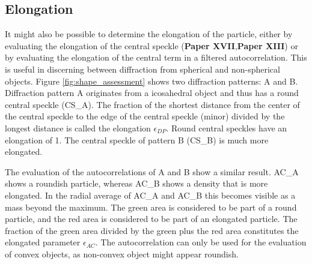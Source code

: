 \subsection{Elongation}

It might also be possible to determine the elongation of the particle, either by evaluating the elongation of the central speckle (\textbf{Paper XVII},\textbf{Paper XIII}) or by evaluating the elongation of the central term in a filtered autocorrelation. This is useful in discerning between diffraction from spherical and non-spherical objects. Figure \ref{fig:shape_assessment} shows two diffraction patterns: A and B. Diffraction pattern A originates from a icosahedral object and thus has a round central speckle (CS\_A). The fraction of the shortest distance from the center of the central speckle to the edge of the central speckle (minor) divided by the longest distance is called the elongation $\epsilon_{DP}$. Round central speckles have an elongation of 1. The central speckle of pattern B (CS\_B) is much more elongated. 

The evaluation of the autocorrelations of A and B show a similar result. AC\_A shows a roundish particle, whereas AC\_B shows a density that is more elongated. In the radial average of AC\_A and AC\_B this becomes visible as a mass beyond the maximum. The green area is considered to be part of a round particle, and the red area is considered to be part of an elongated particle. The fraction of the green area divided by the green plus the red area constitutes the elongated parameter $\epsilon_{AC}$. The autocorrelation can only be used for the evaluation of convex objects, as non-convex object might appear roundish. 

